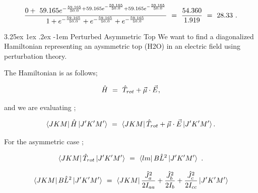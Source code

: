 \documentclass{article}
\makeatletter
\renewcommand\subparagraph{\@startsection{subparagraph}{6}{\parindent}%
  {3.25ex \@plus1ex \@minus .2ex}%
  {-1em}%
  {\normalfont\normalsize\bfseries}}
\makeatother
\begin{document}
\begin{equation} \label{eb-eq-281-1}
\frac{0 + \hspace{0.125cm} 59.165 e^{-\frac{59.165}{50.0} + 59.165 e^{-\frac{59.165}{50.0}}  + 59.165 e^{-\frac{59.165}{50.0}}}}{1 + e^{-\frac{59.165}{50.0}} + e^{-\frac{59.165}{50.0}} + e^{-\frac{59.165}{50.0}}} \hspace{0.125cm} = \hspace{0.125cm} \frac{54.360}{1.919} \hspace{0.125cm} = \hspace{0.125cm} 28.33 \hspace{0.125cm} .
\end{equation} 

\subparagraph{Perturbed Asymmetric Top}
We want to find a diagonalized Hamiltonian representing an aysmmetric top (H2O) in an electric field using perturbation theory. 

The Hamiltonian is as follows;

\begin{equation} \label{eb-eq-252-2}
\hat{H} \hspace{0.125cm} = \hspace{0.125cm} \hat{T}_{rot} + \vec\mu\cdot\vec{E} \hspace{0.0125cm} , 
\end{equation}

and we are evaluating ; 

\begin{equation} \label{eb-eq-253-2}
\bra{J K M}\hat{H}\ket{J' K' M'} \hspace{0.125cm} = \hspace{0.125cm} \bra{J K M} \hat{T}_{rot} + \vec\mu\cdot\vec{E}\ket{J' K' M'} . 
\end{equation}

For the asymmetric case ;

\begin{equation} \label{eb-eq-254-7}
\bra{J K M}\hat{T}_{rot}\ket{J' K' M'} \hspace{0.125cm} = \hspace{0.125cm} \bra{l m}B\hat{L}^{2}\ket{J' K' M'} \hspace{0.125cm} .
\end{equation}

\begin{equation} \label{eb-eq-255-6}
\bra{J K M}B\hat{L}^{2}\ket{J' K' M'} \hspace{0.125cm} = \hspace{0.125cm} \bra{J K M} \frac{\hat{J}_{a}^{2}}{2 I_{aa}} + \frac{\hat{J}_{b}^{2}}{2 I_{b}} + \frac{\hat{J}_{c}^{2}}{2 I_{cc}} \ket{J' K' M'}
\end{equation}
\end{document}
